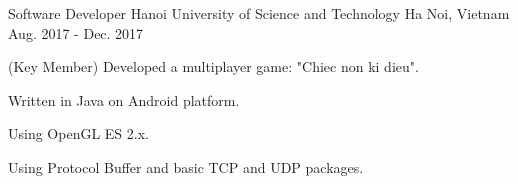 \begin{cventries}

\cventry
{Software Developer} %
{Hanoi University of Science and Technology} %
{Ha Noi, Vietnam} %
{Aug. 2017 - Dec. 2017} %
{ %
\begin{cvitems}
\item{(Key Member) Developed a multiplayer game: "Chiec non ki dieu".}
\item{Written in Java on Android platform.}
\item{Using OpenGL ES 2.x.}
\item{Using Protocol Buffer and basic TCP and UDP packages.}
\end{cvitems}
}


\end{cventries}
